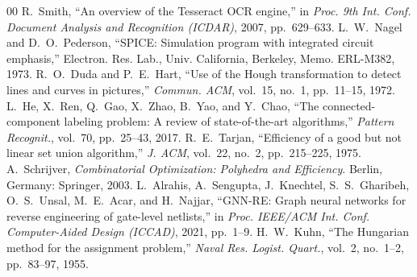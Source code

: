 \documentclass[conference]{IEEEtran}
\begin{document}
\begin{thebibliography}{00}
 R.~Smith, ``An overview of the Tesseract OCR engine,'' in \textit{Proc. 9th Int. Conf. Document Analysis and Recognition (ICDAR)}, 2007, pp.~629--633.
 L.~W.~Nagel and D.~O.~Pederson, ``SPICE: Simulation program with integrated circuit emphasis,'' Electron. Res. Lab., Univ. California, Berkeley, Memo. ERL-M382, 1973.
 R.~O.~Duda and P.~E.~Hart, ``Use of the Hough transformation to detect lines and curves in pictures,'' \textit{Commun. ACM}, vol.~15, no.~1, pp.~11--15, 1972.
 L.~He, X.~Ren, Q.~Gao, X.~Zhao, B.~Yao, and Y.~Chao, ``The connected-component labeling problem: A review of state-of-the-art algorithms,'' \textit{Pattern Recognit.}, vol.~70, pp.~25--43, 2017.
 R.~E.~Tarjan, ``Efficiency of a good but not linear set union algorithm,'' \textit{J. ACM}, vol.~22, no.~2, pp.~215--225, 1975.
 A.~Schrijver, \textit{Combinatorial Optimization: Polyhedra and Efficiency}. Berlin, Germany: Springer, 2003.
 L.~Alrahis, A.~Sengupta, J.~Knechtel, S.~S.~Gharibeh, O.~S.~Unsal, M.~E.~Acar, and H.~Najjar, ``GNN-RE: Graph neural networks for reverse engineering of gate-level netlists,'' in \textit{Proc. IEEE/ACM Int. Conf. Computer-Aided Design (ICCAD)}, 2021, pp.~1--9.
 H.~W.~Kuhn, ``The Hungarian method for the assignment problem,'' \textit{Naval Res. Logist. Quart.}, vol.~2, no.~1--2, pp.~83--97, 1955.
\end{thebibliography}
\end{document}
